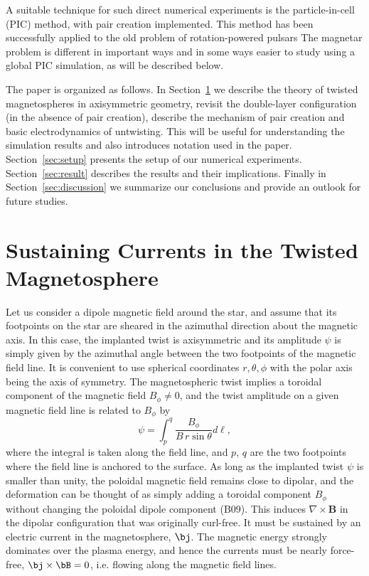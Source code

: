 A suitable technique for such direct numerical experiments is the particle-in-cell
(PIC) method, with pair creation implemented. This method has been
successfully applied to the old problem of rotation-powered pulsars
\citetext{\citealp{chen_pulsar_2014}, hereafter CB14; \citealp{2015ApJ...801L..19P}; \citealp{2015MNRAS.449.2759B}; \citealp{2016MNRAS.457.2401C}}
The magnetar problem is different in important ways and in some ways
easier to study using a global PIC simulation, as will be described below.

The paper is organized as follows. In Section~\ref{sec:theory} we describe the theory of
twisted magnetospheres in axisymmetric geometry, revisit the double-layer
configuration (in the absence of pair creation), describe
the mechanism of pair creation and basic electrodynamics of untwisting.
This will be useful for understanding the simulation results and also introduces
notation used in the paper.
Section~\ref{sec:setup} presents the setup of our numerical experiments.
Section~\ref{sec:result} describes the results and their implications.
Finally in Section~\ref{sec:discussion} we summarize our conclusions and provide an outlook for future studies.


\section{Sustaining Currents in the Twisted Magnetosphere}
\label{sec:theory}


Let us consider a dipole magnetic field around the star,
and assume that its footpoints on the star are sheared in the azimuthal direction
about the magnetic axis. In this case,
the implanted twist is axisymmetric and its amplitude $\psi$ is
simply
given by the azimuthal
angle between the two footpoints of the magnetic field line.
It is convenient to use spherical coordinates $r,\theta,\phi$ with the polar axis being
the axis of symmetry. The magnetospheric twist implies a toroidal component of
the magnetic field $B_\phi\neq 0$, and the twist amplitude on a given magnetic field
line is related to $B_\phi$ by
\begin{equation}
  \label{eq:twist-angle}
  \psi = \int_p^q \frac{B_{\phi}}{B\,r\sin\theta}d \ell,
\end{equation}
where the integral is taken along the field line, and $p$, $q$ are the two
footpoints where the field line is anchored to the surface. As long as the
implanted twist $\psi$ is smaller than unity, the poloidal magnetic field
remains close to dipolar, and the deformation can be thought of as simply adding
a toroidal component $B_{\phi}$ without changing the poloidal dipole component
(B09). This induces $\nabla\times \mathbf{B}$ in the dipolar configuration that
was originally curl-free. It must be sustained by an electric current in the
magnetosphere, $\bj$. The magnetic energy strongly dominates over the plasma
energy, and hence the currents must be nearly force-free, $\bj\times\bB=0$, i.e.
flowing along the magnetic field lines.


